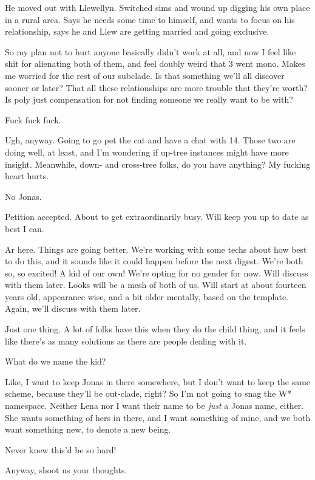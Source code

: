 He moved out with Llewellyn. Switched sims and wound up digging his own place in a rural area. Says he needs some time to himself, and wants to focus on his relationship, says he and Llew are getting married and going exclusive.

So my plan not to hurt anyone basically didn't work at all, and now I feel like shit for alienating both of them, and feel doubly weird that 3 went mono. Makes me worried for the rest of our subclade. Is that something we'll all discover sooner or later? That all these relationships are more trouble that they're worth? Is poly just compensation for not finding someone we really want to be with?

Fuck fuck fuck.

Ugh, anyway. Going to go pet the cat and have a chat with 14. Those two are doing well, at least, and I'm wondering if up-tree instances might have more insight. Meanwhile, down- and cross-tree folks, do you have anything? My fucking heart hurts.

\secdiv{}

\noindent No Jonas.

Petition accepted. About to get extraordinarily busy. Will keep you up to date as best I can.

\secdiv{}

\noindent Ar here. Things are going better. We're working with some techs about how best to do this, and it sounds like it could happen before the next digest. We're both so, so excited! A kid of our own! We're opting for no gender for now. Will discuss with them later. Looks will be a mesh of both of us. Will start at about fourteen years old, appearance wise, and a bit older mentally, based on the template. Again, we'll discuss with them later.

Just one thing. A lot of folks have this when they do the child thing, and it feels like there's as many solutions as there are people dealing with it.

What do we name the kid?

Like, I want to keep Jonas in there somewhere, but I don't want to keep the same scheme, because they'll be out-clade, right? So I'm not going to snag the W* namespace. Neither Lena nor I want their name to be \emph{just} a Jonas name, either. She wants something of hers in there, and I want something of mine, and we both want something new, to denote a new being.

Never knew this'd be so hard!

Anyway, shoot us your thoughts.

